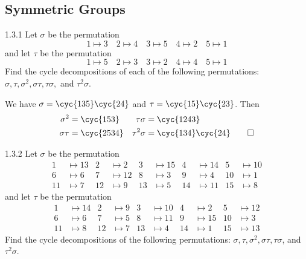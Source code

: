 \subsection{Symmetric Groups}

\begin{exercise}{1.3.1}
    Let $\sigma$ be the permutation
    \[
    	1 \mapsto 3 \quad 2 \mapsto 4 \quad 3 \mapsto 5 \quad 4 \mapsto 2 \quad 5 \mapsto 1
    \]
    and let $\tau$ be the permutation
    \[
    	1 \mapsto 5 \quad 2 \mapsto 3 \quad 3 \mapsto 2 \quad 4 \mapsto 4 \quad 5 \mapsto 1
    \]
    Find the cycle decompositions of each of the following permutations:
    $\sigma, \tau, \sigma^2, \sigma\tau, \tau\sigma,$ and $\tau^2\sigma.$
\end{exercise}

\begin{sol}
    We have $\sigma = \cyc{1 3 5}\cyc{2 4}$ and $\tau = \cyc{1 5}\cyc{2 3}$.
    Then
    \begin{align*}
        \sigma^2 & = \cyc{1 5 3} & \tau\sigma & = \cyc{1 2 4 3} \\
        \sigma\tau & = \cyc{2 5 3 4} & \tau^2\sigma & = \cyc{1 3 4}\cyc{2 4} \qedhere
    \end{align*}
\end{sol}

\begin{exercise}{1.3.2} 
    Let $\sigma$ be the permutation
    \begin{align*}
        1 &\mapsto 13 & 2 &\mapsto 2 & 3 & \mapsto 15 & 4 & \mapsto 14 & 5 & \mapsto 10  \\
        6 &\mapsto 6 & 7 &\mapsto 12 & 8 & \mapsto 3 & 9 & \mapsto 4 & 10 & \mapsto 1 \\
        11 &\mapsto 7 & 12 &\mapsto 9 & 13 & \mapsto 5 & 14 & \mapsto 11 & 15 & \mapsto 8
    \end{align*}
    and let $\tau$ be the permutation
    \begin{align*}
        1 &\mapsto 14 & 2 &\mapsto 9 & 3 &\mapsto 10 & 4 &\mapsto 2 & 5 &\mapsto 12 \\
        6 &\mapsto 6 & 7 &\mapsto 5 & 8 &\mapsto 11 & 9 &\mapsto 15 & 10 &\mapsto 3 \\
        11 &\mapsto 8 & 12 &\mapsto 7 & 13 &\mapsto 4 & 14 &\mapsto 1 & 15 &\mapsto 13
    \end{align*}
    Find the cycle decompositions of the following permutations: $\sigma, \tau, \sigma^2, \sigma\tau, \tau\sigma$, and $\tau^2\sigma.$
\end{exercise}

